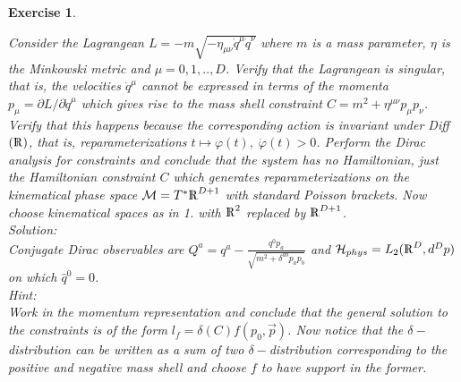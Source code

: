 \documentclass[12pt]{report}
\newtheorem{Exercise}{Exercise}[section]
\def\Rl{{\mathchoice
{\setbox0=\hbox{$\displaystyle\rm R$}\hbox{\hbox to0pt
{\kern0.4\wd0\vrule height0.9\ht0\hss}\box0}}
{\setbox0=\hbox{$\textstyle\rm R$}\hbox{\hbox to0pt
{\kern0.4\wd0\vrule height0.9\ht0\hss}\box0}}
{\setbox0=\hbox{$\scriptstyle\rm R$}\hbox{\hbox to0pt
{\kern0.4\wd0\vrule height0.9\ht0\hss}\box0}}
{\setbox0=\hbox{$\scriptscriptstyle\rm R$}\hbox{\hbox to0pt
{\kern0.4\wd0\vrule height0.9\ht0\hss}\box0}}}}
\begin{document}
\begin{Exercise}
\begin{itemize}
Consider the Lagrangean $L=-m\sqrt{-\eta_{\mu\nu} \dot{q}^\mu 
\dot{q}^\nu}$ where $m$ is a mass parameter, $\eta$ is the Minkowski
metric and $\mu=0,1,..,D$. Verify that the Lagrangean is singular, that
is, the velocities $\dot{q}^\mu$ cannot be expressed in terms of the 
momenta $p_\mu=\partial L/\partial \dot{q}^\mu$ which gives rise to the 
{\it mass shell constraint} $C=m^2+\eta^{\mu\nu} p_\mu p_\nu$. Verify 
that this happens because the corresponding action is invariant under
Diff$(\Rl)$, that is, reparameterizations $t\mapsto \varphi(t),\;
\dot{\varphi}(t)>0$. Perform the Dirac analysis for constraints and 
conclude that the system has no Hamiltonian, just the Hamiltonian 
constraint $C$ which generates reparameterizations on the kinematical 
phase space ${\cal M}=T^\ast \Rl^{D+1}$ with standard Poisson brackets.
Now choose kinematical spaces as in 1. with $\Rl^2$ replaced by 
$\Rl^{D+1}$.\\
Solution:\\
Conjugate Dirac observables are 
$Q^a=q^a-\frac{q^0 p_a}{\sqrt{m^2+\delta^{ab}p_a p_b}}$ and 
${\cal H}_{phys}=L_2(\Rl^D,d^D p)$ on which $\hat{q}^0=0$.\\
Hint:\\
Work in the momentum representation and conclude that the general
solution to the constraints is of the form $l_f=\delta(C)f(p_0,\vec{p})$.
Now notice that the $\delta-$distribution can be written as a sum of 
two $\delta-$distribution corresponding to the positive and negative
mass shell and choose $f$ to have support in the former.


\end{itemize}
\end{Exercise}
\end{document}
